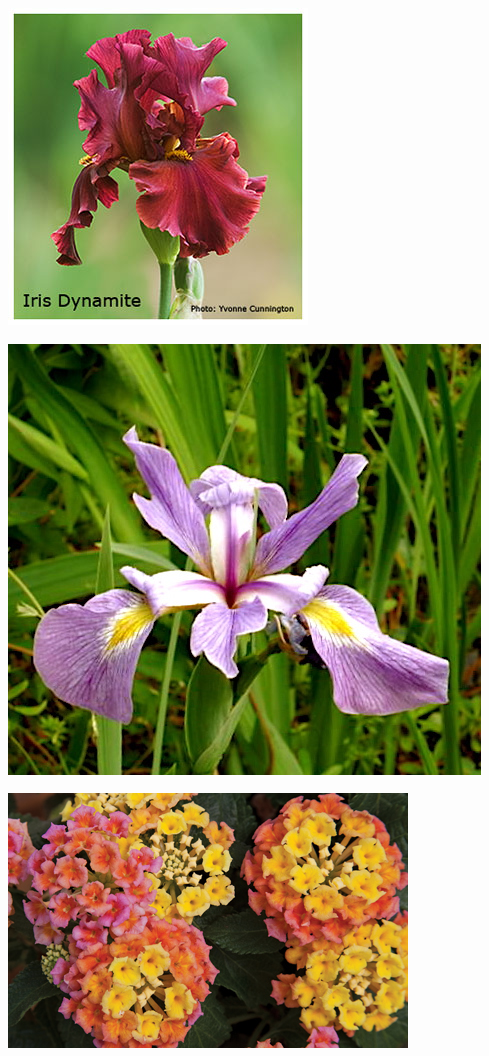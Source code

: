 \documentclass{article}
\begin{document}
\begin{center}
\includegraphics[height=0.9\textheight, angle=90]{../Iris_Dynamite.jpg}
\end{center}
\newpage

\begin{center}
\includegraphics[height=0.9\textheight, angle=90]{../Iris_RiverIris.jpg}
\end{center}
\newpage

\begin{center}
\includegraphics[height=0.9\textheight, angle=90]{../Lantana.jpg}
\end{center}
\newpage
\end{document}
